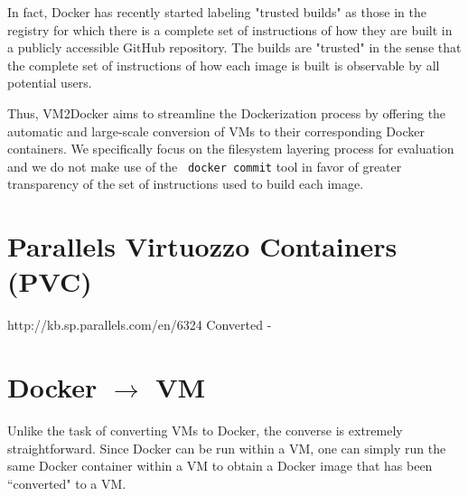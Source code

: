 In fact, Docker has recently started labeling "trusted builds" as those in the registry for which there is a complete set of instructions of how they are built in a publicly accessible GitHub repository. The builds are "trusted" in the sense that the complete set of instructions of how each image is built is observable by all potential users. 

Thus, VM2Docker aims to streamline the Dockerization process by offering the automatic and large-scale conversion of VMs to their corresponding Docker containers. We specifically focus on the filesystem layering process for evaluation and we do not make use of the ~\texttt{docker commit} tool in favor of greater transparency of the set of instructions used to build each image.

\section{Parallels Virtuozzo Containers (PVC)}
\label{sec:pvc}
http://kb.sp.parallels.com/en/6324
Converted - %


\section{Docker $\to$ VM}
\label{sec:dtovm}
Unlike the task of converting VMs to Docker, the converse is extremely straightforward. Since Docker can be run within a VM, one can simply run the same Docker container within a VM to obtain a Docker image that has been ``converted" to a VM.
